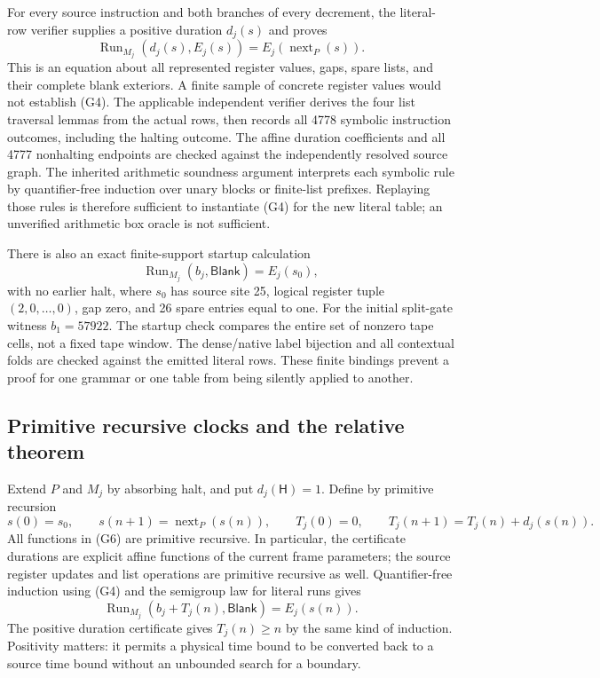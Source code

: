 For every source instruction and both branches of every decrement, the
literal-row verifier supplies a positive duration $d_j(s)$ and proves
\[
 \operatorname{Run}_{M_j}(d_j(s),E_j(s))=E_j(\operatorname{next}_P(s)).
                                                               \tag{G4}
\]
This is an equation about all represented register values, gaps, spare
lists, and their complete blank exteriors.  A finite sample of concrete
register values would not establish (G4).  The applicable independent
verifier derives the four list traversal lemmas from the actual rows,
then records all 4778 symbolic instruction outcomes, including the
halting outcome.  The affine duration coefficients and all 4777
nonhalting endpoints are checked against the independently resolved
source graph.  The inherited arithmetic soundness argument interprets
each symbolic rule by quantifier-free induction over unary blocks or
finite-list prefixes.  Replaying those rules is therefore sufficient
to instantiate (G4) for the new literal table; an unverified arithmetic
box oracle is not sufficient.

There is also an exact finite-support startup calculation
\[
 \operatorname{Run}_{M_j}(b_j,\mathsf{Blank})=E_j(s_0),            \tag{G5}
\]
with no earlier halt, where $s_0$ has source site 25, logical register
tuple $(2,0,\ldots,0)$, gap zero, and 26 spare entries equal to one.
For the initial split-gate witness $b_1=57922$.  The startup check
compares the entire set of nonzero tape cells, not a fixed tape window.
The dense/native label bijection and all contextual folds are checked
against the emitted literal rows.  These finite bindings prevent a
proof for one grammar or one table from being silently applied to
another.

\subsection{Primitive recursive clocks and the relative theorem}

Extend $P$ and $M_j$ by absorbing halt, and put
$d_j(\mathsf H)=1$.  Define by primitive recursion
\[
 s(0)=s_0,\qquad s(n+1)=\operatorname{next}_P(s(n)),\qquad
 T_j(0)=0,\qquad T_j(n+1)=T_j(n)+d_j(s(n)).                       \tag{G6}
\]
All functions in (G6) are primitive recursive.  In particular, the
certificate durations are explicit affine functions of the current
frame parameters; the source register updates and list operations are
primitive recursive as well.  Quantifier-free induction using (G4)
and the semigroup law for literal runs gives
\[
 \operatorname{Run}_{M_j}(b_j+T_j(n),\mathsf{Blank})=E_j(s(n)).    \tag{G7}
\]
The positive duration certificate gives $T_j(n)\geq n$ by the same
kind of induction.  Positivity matters: it permits a physical time
bound to be converted back to a source time bound without an unbounded
search for a boundary.

